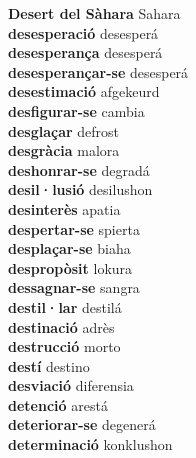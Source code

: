 \textbf{ Desert del Sàhara  } Sahara \\
\textbf{ desesperació  } desesperá \\
\textbf{ desesperança  } desesperá \\
\textbf{ desesperançar-se  } desesperá \\
\textbf{ desestimació  } afgekeurd \\
\textbf{ desfigurar-se  } cambia \\
\textbf{ desglaçar  } defrost \\
\textbf{ desgràcia  } malora \\
\textbf{ deshonrar-se  } degradá \\
\textbf{ desil·lusió  } desilushon \\
\textbf{ desinterès  } apatia \\
\textbf{ despertar-se  } spierta \\
\textbf{ desplaçar-se  } biaha \\
\textbf{ despropòsit  } lokura \\
\textbf{ dessagnar-se  } sangra \\
\textbf{ destil·lar  } destilá \\
\textbf{ destinació  } adrès \\
\textbf{ destrucció  } morto \\
\textbf{ destí  } destino \\
\textbf{ desviació  } diferensia \\
\textbf{ detenció  } arestá \\
\textbf{ deteriorar-se  } degenerá \\
\textbf{ determinació  } konklushon \\
